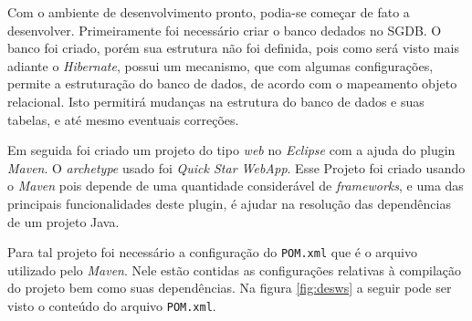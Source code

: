 
	
	\par Com o ambiente de desenvolvimento pronto, podia-se começar de fato a
desenvolver. Primeiramente foi necessário criar o banco dedados no SGDB. O
banco foi criado, porém sua estrutura não foi definida, pois como será
visto mais adiante o \textit{Hibernate}, possui um mecanismo, que com algumas
configurações, permite a estruturação do banco de dados, de acordo com o
mapeamento objeto relacional. Isto permitirá mudanças na estrutura do banco de
dados e suas tabelas, e até mesmo eventuais correções.


	\par Em seguida foi criado um projeto do tipo \textit{web} no \textit{Eclipse}
com a ajuda do plugin \textit{Maven}. O \textit{archetype} usado foi
\textit{Quick Star WebApp}. Esse Projeto foi criado usando o \textit{Maven}
pois depende de uma quantidade considerável de \textit{frameworks}, e uma das
principais funcionalidades deste plugin, é ajudar na resolução das dependências
de um projeto Java.

	\par Para tal projeto foi necessário a configuração do \texttt{POM.xml} que é o
arquivo utilizado pelo \textit{Maven}. Nele estão contidas as configurações
relativas à compilação do projeto bem como suas dependências.  Na figura
\ref{fig:desws} a seguir pode ser visto o conteúdo do arquivo
\texttt{POM.xml}.

